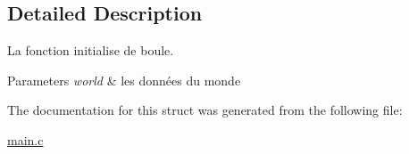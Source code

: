 \subsection{Detailed Description}
La fonction initialise de boule. 


\begin{DoxyParams}{Parameters}
{\em world} & les données du monde \\
\hline
\end{DoxyParams}


The documentation for this struct was generated from the following file\-:\begin{DoxyCompactItemize}
\item 
\hyperlink{main_8c}{main.\-c}\end{DoxyCompactItemize}

